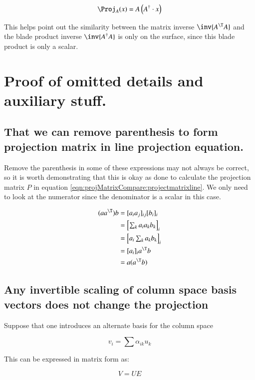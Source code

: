 \[
\Proj_A(x) = A \left(A^\dagger \cdot x\right)
\]

This helps point out the similarity between the matrix inverse $\inv{A^\T A}$ and the blade product inverse $\inv{{A^\dagger}A}$ is only on the surface,
since this blade product is only a scalar.

\section{Proof of omitted details and auxiliary stuff. }

\subsection{That we can remove parenthesis to form projection matrix in line projection equation. }

Remove the parenthesis in some of these expressions may not always be correct, so it is worth demonstrating that this is okay as
done to calculate the projection matrix $P$ in 
equation \ref{eqn:projMatrixCompare:projectmatrixline}.
We only need to look at the numerator since the denominator is a scalar in this case.

\begin{align*}
(a a^\T) b
&= [ a_i a_j ]_{ij} [b_i]_i \\
&= 
{\begin{bmatrix}
\sum_k a_i a_k b_k
\end{bmatrix}
}_i \\
&= 
{\begin{bmatrix}
a_i \sum_k a_k b_k
\end{bmatrix}
}_i \\
&= [ a_i ]_i a^\T b \\
&= a (a^\T b) \\
\end{align*}



\subsection{Any invertible scaling of column space basis vectors does not change the projection }


Suppose that one introduces an alternate basis for the column space


\[
v_i = \sum \alpha_{ik} u_k
\]

This can be expressed in matrix form as:

\[
V = U E
\]

